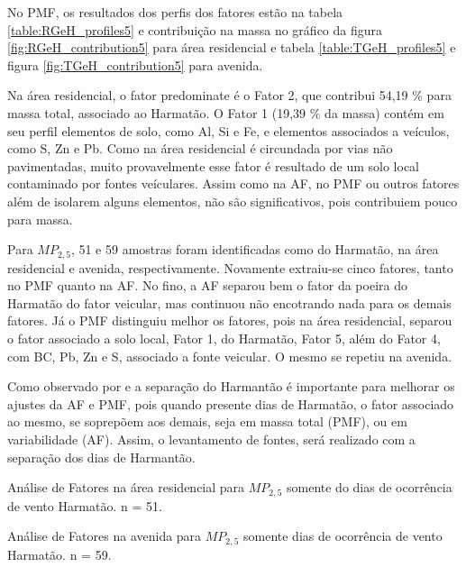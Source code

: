 No PMF, os resultados dos perfis dos fatores estão na tabela 
\ref{table:RGeH_profiles5} e contribuição na massa no gráfico da figura
\ref{fig:RGeH_contribution5} para área residencial e tabela 
\ref{table:TGeH_profiles5} e figura \ref{fig:TGeH_contribution5} para 
avenida. 

Na área residencial, o fator predominate é o Fator 2, que contribui
54,19 \% para massa total, associado ao Harmatão. O Fator 1 (19,39 \% da massa)
contém em seu perfil elementos de solo, como Al, Si e Fe, e elementos associados
a veículos, como S, Zn e Pb. Como na área residencial é circundada por vias 
não pavimentadas, muito provavelmente esse fator é resultado de um solo local
contaminado por fontes veículares. Assim como na AF, no PMF ou outros fatores 
além de isolarem alguns elementos, não são significativos, pois contribuiem 
pouco para massa. 

Para $MP_{2,5}$, 51 e 59 amostras foram identificadas como do Harmatão, 
na área residencial e avenida, respectivamente. Novamente extraiu-se cinco
fatores, tanto no PMF quanto na AF. No fino, a AF separou bem o fator da 
poeira do Harmatão do fator veicular, mas continuou não encotrando nada para 
os demais fatores. Já o PMF distinguiu melhor os fatores, pois na área 
residencial, separou o fator associado a solo local, Fator 1, do Harmatão, 
Fator 5, além do Fator 4, com BC, Pb, Zn e S, associado a fonte veicular. 
O mesmo se repetiu na avenida.    

Como observado por \citet{aboh2009} e \citet{ofosu2013} a separação do Harmantão
é importante para melhorar os ajustes da AF e PMF, pois quando presente dias de
 Harmatão, o fator associado ao mesmo, se soprepõem 
aos demais, seja em massa total (PMF), ou em variabilidade (AF). Assim, 
o levantamento de fontes, será realizado com a separação dos dias de Harmantão.     

\newpage
\begin{table}[H]
  \centering
  
  \caption{Análise de Fatores na área residencial para $MP_{2,5}$
           somente do dias de ocorrência de vento Harmatão. n = 51.
          \label{table:AF_RFeH5}}
\end{table}

\begin{table}[H]
  \centering
  
  \caption{Análise de Fatores na avenida para $MP_{2,5}$
           somente dias de ocorrência de vento Harmatão. n = 59.
          \label{table:AF_TFeH5}}
\end{table}

